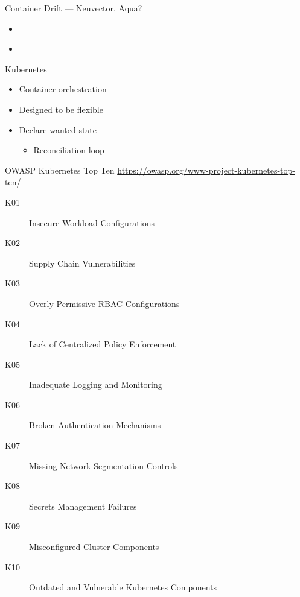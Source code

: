\documentclass{dcpresentation}
\begin{document}
\begin{frame}
  Container Drift --- Neuvector, Aqua?
\end{frame}




\begin{frame}
  \begin{itemize}
  \item 
  \end{itemize}
\end{frame}

\begin{frame}
  \begin{itemize}
  \item 
  \end{itemize}
\end{frame}

\begin{frame}{Kubernetes}
  \begin{itemize}
  \item Container orchestration
  \item Designed to be flexible
  \item Declare wanted state
    \begin{itemize}
    \item Reconciliation loop
    \end{itemize}
  \end{itemize}
\end{frame}


\begin{frame}{OWASP Kubernetes Top Ten}
  {\url{https://owasp.org/www-project-kubernetes-top-ten/}}
  \begin{description}
  \item[K01] Insecure Workload Configurations
  \item[K02] Supply Chain Vulnerabilities
  \item[K03] Overly Permissive RBAC Configurations
  \item[K04] Lack of Centralized Policy Enforcement
  \item[K05] Inadequate Logging and Monitoring
  \item[K06] Broken Authentication Mechanisms
  \item[K07] Missing Network Segmentation Controls
  \item[K08] Secrets Management Failures
  \item[K09] Misconfigured Cluster Components
  \item[K10] Outdated and Vulnerable Kubernetes Components
  \end{description}
\end{frame}
\end{document}
